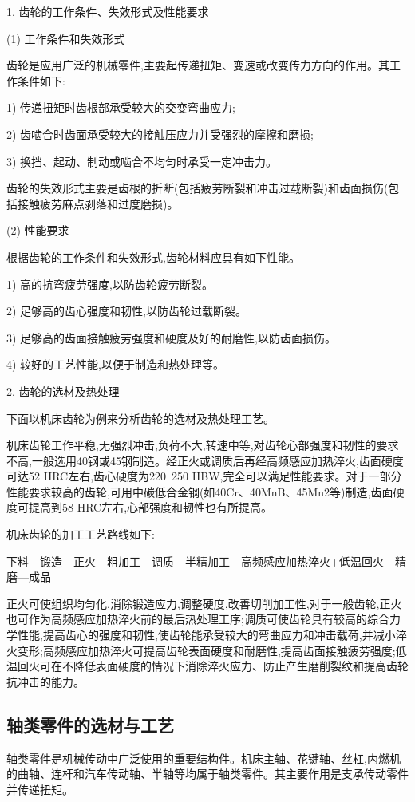 \documentclass[UTF8]{ctexbook}
\newcommand{\◎}{\ensuremath{\bigcirc}}
\begin{document}
1. 齿轮的工作条件、失效形式及性能要求

(1) 工作条件和失效形式

齿轮是应用广泛的机械零件,主要起传递扭矩、变速或改变传力方向的作用。其工作条件如下:

1) 传递扭矩时齿根部承受较大的交变弯曲应力;

2) 齿啮合时齿面承受较大的接触压应力并受强烈的摩擦和磨损;

3) 换挡、起动、制动或啮合不均匀时承受一定冲击力。

齿轮的失效形式主要是齿根的折断(包括疲劳断裂和冲击过载断裂)和齿面损伤(包括接触疲劳麻点剥落和过度磨损)。

(2) 性能要求

根据齿轮的工作条件和失效形式,齿轮材料应具有如下性能。

1) 高的抗弯疲劳强度,以防齿轮疲劳断裂。

2) 足够高的齿心强度和韧性,以防齿轮过载断裂。

3) 足够高的齿面接触疲劳强度和硬度及好的耐磨性,以防齿面损伤。

4) 较好的工艺性能,以便于制造和热处理等。

2. 齿轮的选材及热处理

下面以机床齿轮为例来分析齿轮的选材及热处理工艺。

机床齿轮工作平稳,无强烈冲击,负荷不大,转速中等,对齿轮心部强度和韧性的要求不高,一般选用40钢或45钢制造。经正火或调质后再经高频感应加热淬火,齿面硬度可达52 HRC左右,齿心硬度为220~250 HBW,完全可以满足性能要求。对于一部分性能要求较高的齿轮,可用中碳低合金钢(如40Cr、40MnB、45Mn2等)制造,齿面硬度可提高到58 HRC左右,心部强度和韧性也有所提高。

机床齿轮的加工工艺路线如下:

下料—锻造—正火—粗加工—调质—半精加工—高频感应加热淬火+低温回火—精磨—成品

正火可使组织均匀化,消除锻造应力,调整硬度,改善切削加工性,对于一般齿轮,正火也可作为高频感应加热淬火前的最后热处理工序;调质可使齿轮具有较高的综合力学性能,提高齿心的强度和韧性,使齿轮能承受较大的弯曲应力和冲击载荷,并减小淬火变形;高频感应加热淬火可提高齿轮表面硬度和耐磨性,提高齿面接触疲劳强度;低温回火可在不降低表面硬度的情况下消除淬火应力、防止产生磨削裂纹和提高齿轮抗冲击的能力。

\subsection{轴类零件的选材与工艺}

轴类零件是机械传动中广泛使用的重要结构件。机床主轴、花键轴、丝杠,内燃机的曲轴、连杆和汽车传动轴、半轴等均属于轴类零件。其主要作用是支承传动零件并传递扭矩。
\end{document}
